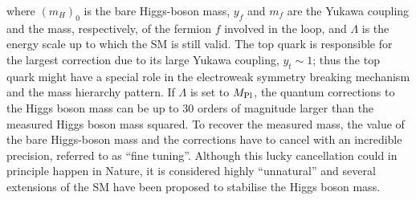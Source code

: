 \noindent where $(m_H)_0$ is the bare Higgs-boson mass, $y_{f}$ and $m_{f}$ are the Yukawa coupling and the mass, respectively, of the fermion $f$ involved in the loop, and $\Lambda$ is the energy scale up to which the SM is still valid. The top quark is responsible for the largest correction due to its large Yukawa coupling, $y_{t}\sim1$; thus the top quark might have a special role in the electroweak symmetry breaking mechanism and the mass hierarchy pattern. If $\Lambda$ is set to $M_{\rm Pl}$, the quantum corrections to the Higgs boson mass can be up to 30 orders of magnitude larger than the measured Higgs boson mass squared. To recover the measured mass, the value of the bare Higgs-boson mass and the corrections have to cancel with an incredible precision, referred to as ``fine tuning''. Although this lucky cancellation could in principle happen in Nature, it is considered highly ``unnatural'' and several extensions of the SM have been proposed to stabilise the Higgs boson mass.


